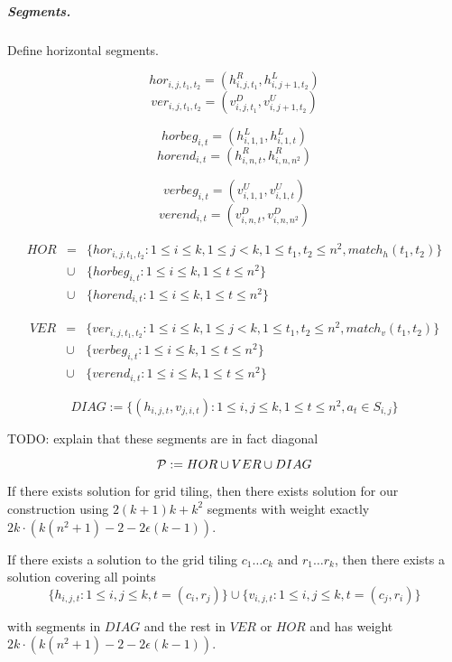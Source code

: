 \subparagraph{Segments.}
Define horizontal segments.

$$hor_{i, j, t_1, t_2} = (h^R_{i,j,t_1}, h^L_{i, j+1, t_2})$$
$$ver_{i, j, t_1, t_2} = (v^D_{i,j,t_1}, v^U_{i, j+1, t_2})$$

$$horbeg_{i, t} = (h^L_{i, 1, 1}, h^L_{i, 1, t})$$
$$horend_{i, t} = (h^R_{i, n, t}, h^R_{i, n, n^2})$$


$$verbeg_{i, t} = (v^U_{i, 1, 1}, v^U_{i, 1, t})$$
$$verend_{i, t} = (v^D_{i, n, t}, v^D_{i, n, n^2})$$

\begin{eqnarray*}
HOR &= &\{hor_{i, j, t_1, t_2} : 1 \le i \le k, 1 \le j < k,
1 \le t_1, t_2 \le n^2, match_h(t_1, t_2)\} \\
&\cup &\{horbeg_{i,t} : 1 \le i \le k, 1 \le t \le n^2\}
\\
&\cup &\{horend_{i,t} : 1 \le i \le k, 1 \le t \le n^2\}
\end{eqnarray*}

\begin{eqnarray*}
VER &= &\{ver_{i, j, t_1, t_2} : 1 \le i \le k, 1 \le j < k,
1 \le t_1, t_2 \le n^2, match_v(t_1, t_2)\} \\
&\cup &\{verbeg_{i,t} : 1 \le i \le k, 1 \le t \le n^2\}
\\
&\cup &\{verend_{i,t} : 1 \le i \le k, 1 \le t \le n^2\}
\end{eqnarray*}

$$DIAG := \{ (h_{i, j, t}, v_{j, i, t}) :
	1 \le i, j \le k, 1 \le t \le n^2, a_t \in S_{i, j}\}$$

TODO: explain that these segments are in fact diagonal

$$\mathcal{P} := HOR \cup VER \cup DIAG$$



\begin{lemma}
	If there exists solution for grid tiling,
	then there exists solution for our construction
	using $2(k+1)k + k^2$ segments
	with weight exactly $2k \cdot (k(n^2+1) - 2 - 2\epsilon(k-1))$.
\end{lemma}

\begin{claim}
	If there exists a solution to the grid tiling
	$c_1 \ldots c_k$ and $r_1 \ldots r_k$,
	then there exists a solution covering
	all points
	$$\{h_{i, j, t} : 1 \le i, j \le k, t=(c_i, r_j)\}
	\cup \{v_{i, j, t} : 1 \le i, j \le k, t=(c_j, r_i)\}$$
	
	with segments in $DIAG$
	and the rest in $VER$ or $HOR$
	and has weight $2k \cdot (k(n^2+1) - 2 - 2\epsilon(k-1))$.
\end{claim}

